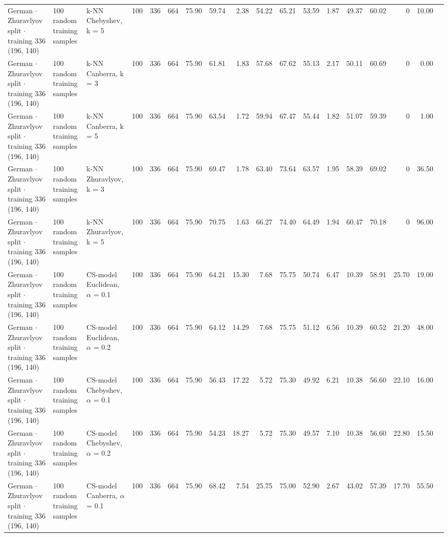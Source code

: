\begin{longtable}{lllrrrrrrrrrrrrrrl}
  German $\cdot$ Zhuravlyov split $\cdot$ training 336 (196, 140) & 100 random training samples & k-NN Chebyshev, k = 5 & 100 & 336 & 664 & 75.90 & 59.74 & 2.38 & 54.22 & 65.21 & 53.59 & 1.87 & 49.37 & 60.02 & 0 & 10.00 &  \\
  German $\cdot$ Zhuravlyov split $\cdot$ training 336 (196, 140) & 100 random training samples & k-NN Canberra, k = 3 & 100 & 336 & 664 & 75.90 & 61.81 & 1.83 & 57.68 & 67.62 & 55.13 & 2.17 & 50.11 & 60.69 & 0 & 0.00 &  \\
  German $\cdot$ Zhuravlyov split $\cdot$ training 336 (196, 140) & 100 random training samples & k-NN Canberra, k = 5 & 100 & 336 & 664 & 75.90 & 63.54 & 1.72 & 59.94 & 67.47 & 55.44 & 1.82 & 51.07 & 59.39 & 0 & 1.00 &  \\
  German $\cdot$ Zhuravlyov split $\cdot$ training 336 (196, 140) & 100 random training samples & k-NN Zhuravlyov, k = 3 & 100 & 336 & 664 & 75.90 & 69.47 & 1.78 & 63.40 & 73.64 & 63.57 & 1.95 & 58.39 & 69.02 & 0 & 36.50 &  \\
  German $\cdot$ Zhuravlyov split $\cdot$ training 336 (196, 140) & 100 random training samples & k-NN Zhuravlyov, k = 5 & 100 & 336 & 664 & 75.90 & 70.75 & 1.63 & 66.27 & 74.40 & 64.49 & 1.94 & 60.47 & 70.18 & 0 & 96.00 &  \\
  German $\cdot$ Zhuravlyov split $\cdot$ training 336 (196, 140) & 100 random training samples & CS-model Euclidean, $\alpha$ = 0.1 & 100 & 336 & 664 & 75.90 & 64.21 & 15.30 & 7.68 & 75.75 & 50.74 & 6.47 & 10.39 & 58.91 & 25.70 & 19.00 &  \\
  German $\cdot$ Zhuravlyov split $\cdot$ training 336 (196, 140) & 100 random training samples & CS-model Euclidean, $\alpha$ = 0.2 & 100 & 336 & 664 & 75.90 & 64.12 & 14.29 & 7.68 & 75.75 & 51.12 & 6.56 & 10.39 & 60.52 & 21.20 & 48.00 &  \\
  German $\cdot$ Zhuravlyov split $\cdot$ training 336 (196, 140) & 100 random training samples & CS-model Chebyshev, $\alpha$ = 0.1 & 100 & 336 & 664 & 75.90 & 56.43 & 17.22 & 5.72 & 75.30 & 49.92 & 6.21 & 10.38 & 56.60 & 22.10 & 16.00 &  \\
  German $\cdot$ Zhuravlyov split $\cdot$ training 336 (196, 140) & 100 random training samples & CS-model Chebyshev, $\alpha$ = 0.2 & 100 & 336 & 664 & 75.90 & 54.23 & 18.27 & 5.72 & 75.30 & 49.57 & 7.10 & 10.38 & 56.60 & 22.80 & 15.50 &  \\
  German $\cdot$ Zhuravlyov split $\cdot$ training 336 (196, 140) & 100 random training samples & CS-model Canberra, $\alpha$ = 0.1 & 100 & 336 & 664 & 75.90 & 68.42 & 7.54 & 25.75 & 75.00 & 52.90 & 2.67 & 43.02 & 57.39 & 17.70 & 55.50 &  \\

\end{longtable}
